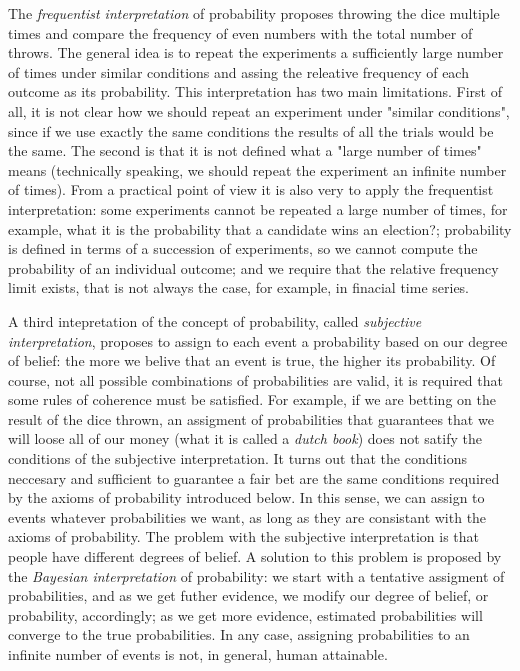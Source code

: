 The \emph{frequentist interpretation} of probability proposes throwing the dice multiple times and compare the frequency of even numbers with the total number of throws. The general idea is to repeat the experiments a sufficiently large number of times under similar conditions and assing the releative frequency of each outcome as its probability. This interpretation has two main limitations. First of all, it is not clear how we should repeat an experiment under "similar conditions", since if we use exactly the same conditions the results of all the trials would be the same. The second is that it is not defined what a "large number of times" means (technically speaking, we should repeat the experiment an infinite number of times). From a practical point of view it is also very to apply the frequentist interpretation: some experiments cannot be repeated a large number of times, for example, what it is the probability that a candidate wins an election?; probability is defined in terms of a succession of experiments, so we cannot compute the probability of an individual outcome; and we require that the relative frequency limit exists, that is not always the case, for example, in finacial time series.

A third intepretation of the concept of probability, called \emph{subjective interpretation}, proposes to assign to each event a probability based on our degree of belief: the more we belive that an event is true, the higher its probability. Of course, not all possible combinations of probabilities are valid, it is required that some rules of coherence must be satisfied. For example, if we are betting on the result of the dice thrown, an assigment of probabilities that guarantees that we will loose all of our money (what it is called a \emph{dutch book}) does not satify the conditions of the subjective interpretation. It turns out that the conditions neccesary and sufficient to guarantee a fair bet are the same conditions required by the axioms of probability introduced below. In this sense, we can assign to events whatever probabilities we want, as long as they are consistant with the axioms of probability. The problem with the subjective interpretation is that people have different degrees of belief. A solution to this problem is proposed by the \emph{Bayesian interpretation} of probability: we start with a tentative assigment of probabilities, and as we get futher evidence, we modify our degree of belief, or probability, accordingly; as we get more evidence, estimated probabilities will converge to the true probabilities. In any case, assigning probabilities to an infinite number of events is not, in general, human attainable. 


